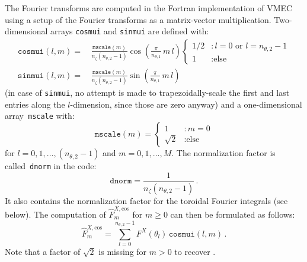 The Fourier transforms are computed in the Fortran implementation of VMEC using
a setup of the Fourier transforms as a matrix-vector multiplication.
Two-dimensional arrays \texttt{cosmui} and \texttt{sinmui} are defined with:
\begin{align}
  \texttt{cosmui}(l,m) =&\, \frac{\texttt{mscale}(m)}{n_\zeta (n_{\theta,2}-1)} \cos\left(\frac{\pi}{n_{\theta,1}} \,m \,l\right) \begin{cases}
                                                                                                                          1/2 &: l=0 \textrm{ or } l=n_{\theta,2}-1 \\
                                                                                                                          1   &: \textrm{else}
                                                                                                                        \end{cases} \\
  \texttt{sinmui}(l,m) =&\, \frac{\texttt{mscale}(m)}{n_\zeta (n_{\theta,2}-1)} \sin\left(\frac{\pi}{n_{\theta,1}} \,m \,l\right)
\end{align}
(in case of \texttt{sinmui}, no attempt is made to trapezoidally-scale the first and last entries along the $l$-dimension, since those are zero anyway)
and a one-dimensional array~\texttt{mscale} with:
\begin{equation}
  \texttt{mscale}(m) = \begin{cases}
                               1  &: m=0           \\
                         \sqrt{2} &: \textrm{else}
                       \end{cases}
\end{equation}
for $l=0,1, ..., (n_{\theta,2}-1)$ and $m=0,1, ..., M$.
The normalization factor is called~\texttt{dnorm} in the code:
\begin{equation}
  \texttt{dnorm} = \frac{1}{n_\zeta (n_{\theta,2}-1)} \, .
\end{equation}
It also contains the normalization factor for the toroidal Fourier integrals (see below).
The computation of $\hat{F}^{X,\mathrm{cos}}_m$ for $m\geq0$ can then be formulated as follows:
\begin{equation}
  \hat{F}^{X,\mathrm{cos}}_m = \sum\limits_{l=0}^{n_{\theta,2}-1} F^{X}(\theta_l) \, \texttt{cosmui}(l,m) \, .
\end{equation}
Note that a factor of $\sqrt{2}$ is missing for $m>0$ to recover .
